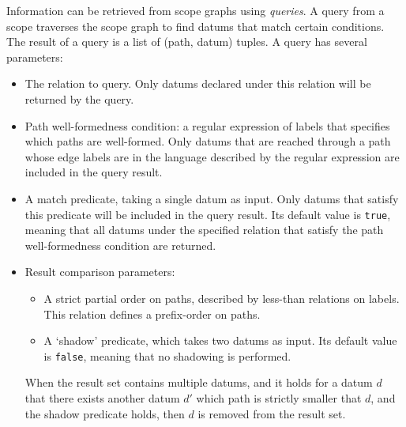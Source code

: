 Information can be retrieved from scope graphs using \textit{queries}. A query from a scope traverses the scope graph to find datums that match certain conditions. The result of a query is a list of (path, datum) tuples. A query has several parameters:
\begin{itemize}
	\item The relation to query. Only datums declared under this relation will be returned by the query.
	\item Path well-formedness condition: a regular expression of labels that specifies which paths are well-formed. Only datums that are reached through a path whose edge labels are in the language described by the regular expression are included in the query result.
	\item A match predicate, taking a single datum as input. Only datums that satisfy this predicate will be included in the query result. Its default value is \verb|true|, meaning that all datums under the specified relation that satisfy the path well-formedness condition are returned.
	\item Result comparison parameters:
	\begin{itemize}
		\item A strict partial order on paths, described by less-than relations on labels. This relation defines a prefix-order on paths.
		\item A `shadow' predicate, which takes two datums as input. Its default value is \verb|false|, meaning that no shadowing is performed.
	\end{itemize}
	When the result set contains multiple datums, and it holds for a datum $d$ that there exists another datum $d'$ which path is strictly smaller that $d$, and the shadow predicate holds, then $d$ is removed from the result set.
\end{itemize}

